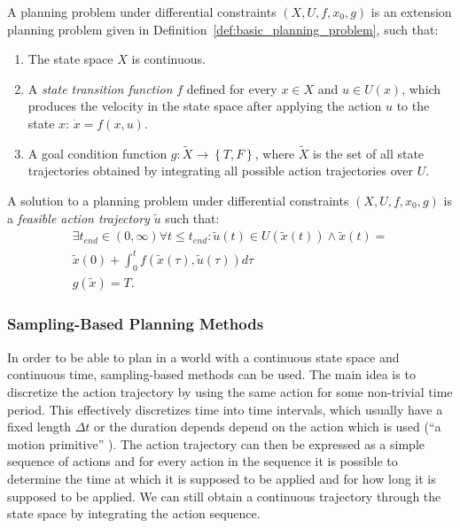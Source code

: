 \begin{defn}
	\label{def:planning_problem_under_differential_constraints}
	A planning problem under differential constraints $\left(X, U, f, x_0, g\right)$ is an extension planning problem given in Definition~\ref{def:basic_planning_problem}, such that:
	
	\begin{enumerate}
		\item The state space $X$ is continuous.
		\item A \textit{state transition function} $f$ defined for every $x\in X$ and $u\in U(x)$, which produces the velocity in the state space after applying the action $u$ to the state $x$: $\dot{x}=f(x, u)$.
		\item A goal condition function $g: \tilde{X} \rightarrow \left\{T, F\right\}$, where $\tilde{X}$ is the set of all state trajectories obtained by integrating all possible action trajectories over $U$.
	\end{enumerate}
\end{defn}

\begin{defn}
	A solution to a planning problem under differential constraints $\left(X, U, f, x_0, g\right)$ is a \textit{feasible action trajectory} $\tilde{u}$ such that:
	\begin{gather*}
	\exists t_{end} \in \left(0, \infty\right) \forall t \leq t_{end}: \tilde{u}(t)\in U(\tilde{x}(t)) \wedge \tilde{x}(t) = \\ \tilde{x}(0) + \int_0^t f(\tilde{x}(\tau), \tilde{u}(\tau)) d\tau \\
	g(\tilde{x})=T.
	\end{gather*}
\end{defn}

\subsubsection{Sampling-Based Planning Methods}

In order to be able to plan in a world with a continuous state space and continuous time, sampling-based methods can be used. The main idea is to discretize the action trajectory by using the same action for some non-trivial time period. This effectively discretizes time into time intervals, which usually have a fixed length $\Delta t$ or the duration depends depend on the action which is used (``a motion primitive'' \cite[Section~14.2.3]{lavalle_2006}). The action trajectory can then be expressed as a simple sequence of actions and for every action in the sequence it is possible to determine the time at which it is supposed to be applied and for how long it is supposed to be applied. We can still obtain a continuous trajectory through the state space by integrating the action sequence.

